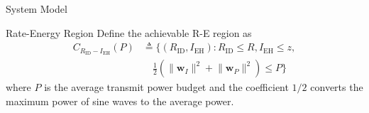 \documentclass{IEEEtran}
\begin{document}
\begin{section}{System Model}
	\begin{subsection}{Rate-Energy Region}
		Define the achievable R-E region as
		\begin{equation}
			\begin{split}
				C_{R_{\text{ID}}-I_{\text{EH}}}(P)
				&\triangleq \biggl\{(R_{\text{ID}}, I_{\text{EH}}): R_{\text{ID}} \le R, I_{\text{EH}} \le z,\\
				&\quad \frac{1}{2}\left(\lVert{\boldsymbol{w}_I}\rVert^2+\lVert{\boldsymbol{w}_P}\rVert^2\right) \le P\biggr\}
			\end{split}
		\end{equation}
		where $P$ is the average transmit power budget and the coefficient $1/2$ converts the maximum power of sine waves to the average power.
	\end{subsection}
\end{section}
\end{document}
